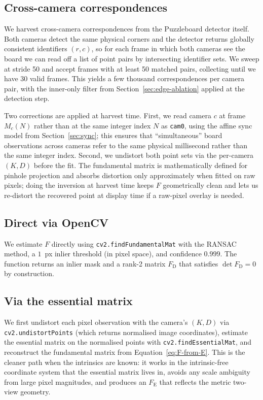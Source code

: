 \documentclass[twocolumn]{article}
\newcommand{\cam}[1]{\texttt{cam#1}}
\begin{document}
\subsection{Cross-camera correspondences}

We harvest cross-camera correspondences from the Puzzleboard detector
itself. Both cameras detect the same physical corners and the
detector returns globally consistent identifiers $(r, c)$, so for
each frame in which both cameras see the board we can read off a
list of point pairs by intersecting identifier sets. We sweep at
stride 50 and accept frames with at least 50 matched pairs,
collecting until we have 30 valid frames. This yields a few thousand
correspondences per camera pair, with the inner-only filter from
Section~\ref{sec:edge-ablation} applied at the detection step.

Two corrections are applied at harvest time. First, we read camera
$c$ at frame $M_c(N)$ rather than at the same integer index $N$ as
\cam{0}, using the affine sync model from Section~\ref{sec:sync}; this
ensures that ``simultaneous'' board observations across cameras refer
to the same physical millisecond rather than the same integer index.
Second, we undistort both point sets via the per-camera $(K, D)$
before the fit. The fundamental matrix is mathematically defined for
pinhole projection and absorbs distortion only approximately when
fitted on raw pixels; doing the inversion at harvest time keeps $F$
geometrically clean and lets us re-distort the recovered point at
display time if a raw-pixel overlay is needed.

\subsection{Direct via OpenCV}
\label{sec:F-direct}

We estimate $F$ directly using \texttt{cv2.findFundamentalMat} with
the RANSAC method, a $1$~px inlier threshold (in pixel space), and
confidence $0.999$. The function returns an inlier mask and a rank-2
matrix $F_{\text{D}}$ that satisfies $\det F_{\text{D}} = 0$ by
construction.

\subsection{Via the essential matrix}
\label{sec:F-essential}

We first undistort each pixel observation with the camera's
$(K, D)$ via \texttt{cv2.undistortPoints} (which returns normalised
image coordinates), estimate the essential matrix on the normalised
points with \texttt{cv2.findEssentialMat}, and reconstruct the
fundamental matrix from Equation~\ref{eq:F-from-E}. This is the
cleaner path when the intrinsics are known: it works in the
intrinsic-free coordinate system that the essential matrix lives in,
avoids any scale ambiguity from large pixel magnitudes, and produces
an $F_{\text{E}}$ that reflects the metric two-view geometry.
\end{document}
